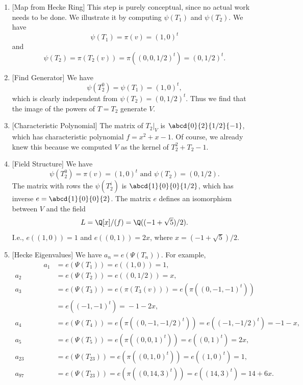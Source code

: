 \begin{example}
\begin{enumerate}
\item{}[Map from Hecke Ring] 
This step is purely conceptual, since no actual work needs to be
done.  We illustrate it by computing $\psi(T_1)$ and $\psi(T_2)$. 
 We have
$$\psi(T_1) = \pi(v) = (1,0)^t$$
and 
$$\psi(T_2) = \pi(T_2(v)) = \pi((0,0,1/2)^t) = (0,1/2)^t.$$

\item{}[Find Generator] We have 
$$\psi(T_2^0) = \psi(T_1) = (1,0)^t,$$
which is clearly independent from $\psi(T_2)=(0,1/2)^t$.  Thus we
find that the image of the powers of $T=T_2$ generate $V$.

\item{}[Characteristic Polynomial]  The matrix
of $T_2|_V$  is $\abcd{0}{2}{1/2}{-1}$, which has characteristic
polynomial $f=x^2+x-1$.   Of course, we already knew this because
we computed $V$ as the kernel of $T_2^2+T_2-1$.

\item{}[Field Structure] We have 
$$\psi(T_2^0) = \pi(v) = (1,0)^t
\text{ and } 
\psi(T_2) = (0,1/2).$$
The matrix with rows the $\psi(T_2^i)$
is $\abcd{1}{0}{0}{1/2}$, which has inverse $e=\abcd{1}{0}{0}{2}$.
The matrix $e$ defines an isomorphism between $V$ and
the field $$L=\Q[x]/(f) = \Q((-1+\sqrt{5})/2).$$
I.e., $e((1,0))=1$ and $e((0,1))=2x$, where $x=(-1+\sqrt{5})/2$.

\item{}[Hecke Eigenvalues] We have $a_n = e(\Psi(T_n))$.  For example,
\begin{align*}
\qquad\qquad  a_1 &= e(\Psi(T_1)) = e((1,0)) = 1,\\
  a_2 &= e(\Psi(T_2)) = e((0,1/2)) = x,\\
  a_3 &= e(\Psi(T_3)) = e(\pi(T_3(v))) \!=\! e(\pi((0,-1,-1)^t))\\
      &= e((-1,-1)^t)\!=\! -1-2x,\\
  a_4 &= e(\Psi(T_4)) = e(\pi((0,-1,-1/2)^t)) = e((-1,-1/2)^t) = -1-x,\\
  a_5 &= e(\Psi(T_5)) = e(\pi((0,0,1)^t)) = e((0,1)^t) = 2x,\\
  a_{23} &=   e(\Psi(T_{23})) = e(\pi((0,1,0)^t)) = e((1,0)^t) = 1,\\
  a_{97} &= e(\Psi(T_{23})) = e(\pi((0,14,3)^t)) = e((14,3)^t) = 14+6x.
 \end{align*}
\end{enumerate}
\end{example}


